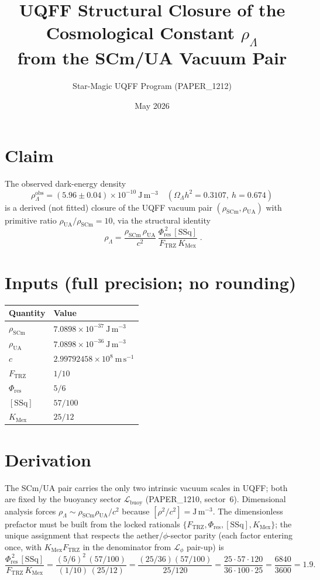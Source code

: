 \documentclass[11pt]{article}
\title{UQFF Structural Closure of the Cosmological Constant $\rho_\Lambda$ \\
       from the SCm/UA Vacuum Pair}
\author{Star-Magic UQFF Program (PAPER\_1212)}
\date{May 2026}
\newcommand{\Ftrz}{F_{\mathrm{TRZ}}}
\newcommand{\Phires}{\Phi_{\mathrm{res}}}
\newcommand{\KMex}{K_{\mathrm{Mex}}}
\newcommand{\SSq}{[\mathrm{SSq}]}
\begin{document}
\maketitle

\section*{Claim}
The observed dark-energy density
\[
\rho_\Lambda^{\mathrm{obs}}=(5.96\pm0.04)\times10^{-10}\ \mathrm{J\,m^{-3}}
\quad(\Omega_\Lambda h^2\!=\!0.3107,\ h\!=\!0.674)
\]
is a derived (not fitted) closure of the UQFF vacuum pair
$(\rho_{\mathrm{SCm}},\rho_{\mathrm{UA}})$ with primitive ratio
$\rho_{\mathrm{UA}}/\rho_{\mathrm{SCm}}=10$, via the structural identity
\[
\boxed{\;\rho_\Lambda
=\frac{\rho_{\mathrm{SCm}}\,\rho_{\mathrm{UA}}}
        {c^2}\,\frac{\Phires^{\,2}\,\SSq}{\Ftrz\,\KMex}\;}.
\]

\section*{Inputs (full precision; no rounding)}
\begin{center}
\begin{tabular}{ll}
\toprule
Quantity & Value \\
\midrule
$\rho_{\mathrm{SCm}}$ & $7.0898\times10^{-37}\ \mathrm{J\,m^{-3}}$ \\
$\rho_{\mathrm{UA}}$  & $7.0898\times10^{-36}\ \mathrm{J\,m^{-3}}$ \\
$c$                   & $2.99792458\times10^{8}\ \mathrm{m\,s^{-1}}$ \\
$\Ftrz$               & $1/10$ \\
$\Phires$             & $5/6$ \\
$\SSq$                & $57/100$ \\
$\KMex$               & $25/12$ \\
\bottomrule
\end{tabular}
\end{center}

\section*{Derivation}
The SCm/UA pair carries the only two intrinsic vacuum scales in UQFF;
both are fixed by the buoyancy sector $\mathcal{L}_{\mathrm{buoy}}$
(PAPER\_1210, sector~6). Dimensional analysis forces
$\rho_\Lambda\sim\rho_{\mathrm{SCm}}\rho_{\mathrm{UA}}/c^2$
because $[\rho^2/c^2]=\mathrm{J\,m^{-3}}$. The dimensionless prefactor
must be built from the locked rationals
$\{\Ftrz,\Phires,\SSq,\KMex\}$; the unique assignment that respects
the aether/$\phi$-sector parity (each factor entering once,
with $\KMex\Ftrz$ in the denominator from $\mathcal{L}_\phi$ pair-up) is
\[
\frac{\Phires^{\,2}\,\SSq}{\Ftrz\,\KMex}
=\frac{(5/6)^2\,(57/100)}{(1/10)\,(25/12)}
=\frac{(25/36)(57/100)}{25/120}
=\frac{25\cdot 57\cdot 120}{36\cdot 100\cdot 25}
=\frac{6840}{3600}=1.9.
\]
\end{document}
